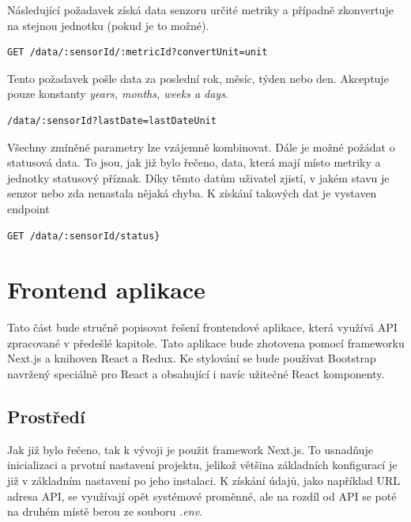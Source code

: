 \documentclass[thesis=M,czech]{FITthesis}[2018/10/20]
\begin{document}
Následující požadavek získá data senzoru určité metriky a případně zkonvertuje na stejnou jednotku (pokud je to možné).
\begin{lstlisting}
GET /data/:sensorId/:metricId?convertUnit=unit
\end{lstlisting}
Tento požadavek pošle data za poslední rok, měsíc, týden nebo den. Akceptuje pouze konstanty \textit {years, months, weeks a days}.
\begin{lstlisting}
/data/:sensorId?lastDate=lastDateUnit
\end{lstlisting}
Všechny zmíněné parametry lze vzájemně kombinovat. Dále je možné požádat o statusová data. To jsou, jak již bylo řečeno, data, která mají místo metriky a jednotky statusový příznak. Díky těmto datům uživatel zjistí, v jakém stavu je senzor nebo zda nenastala nějaká chyba. K získání takových dat je vystaven endpoint 
\begin{lstlisting}
GET /data/:sensorId/status}
\end{lstlisting}

\chapter{Frontend aplikace}
Tato část bude stručně popisovat řešení frontendové aplikace, která využívá API zpracované v předešlé kapitole. Tato aplikace bude zhotovena pomocí frameworku Next.js a knihoven React a Redux. Ke stylování se bude používat Bootstrap navržený speciálně pro React a obsahující i navíc užitečné React komponenty.

\section{Prostředí}
Jak již bylo řečeno, tak k vývoji je použit framework Next.js. To usnadňuje inicializaci a prvotní nastavení projektu, jelikož většina základních konfigurací je již v základním nastavení po jeho instalaci. K získání údajů, jako například URL adresa API, se využívají opět systémové proměnné, ale na rozdíl od API se poté na druhém místě berou ze souboru \textit{.env}.
\end{document}
